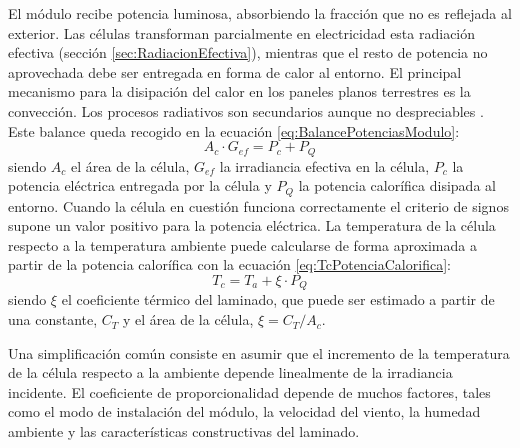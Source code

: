 El módulo recibe potencia luminosa, absorbiendo la fracción que no
es reflejada al exterior. Las células transforman parcialmente en
electricidad esta radiación efectiva (sección \ref{sec:RadiacionEfectiva}),
mientras que el resto de potencia no aprovechada debe ser entregada
en forma de calor al entorno. El principal mecanismo para la disipación
del calor en los paneles planos terrestres es la convección. Los procesos
radiativos son secundarios aunque no despreciables \citep{Luque.Hegedus2003}.
Este balance queda recogido en la ecuación \ref{eq:BalancePotenciasModulo}:
\begin{equation}
A_{c}\cdot G_{ef}=P_{c}+P_{Q}\label{eq:BalancePotenciasModulo}\end{equation}
siendo $A_{c}$ el área de la célula, $G_{ef}$ la irradiancia efectiva
en la célula, $P_{c}$ la potencia eléctrica entregada por la célula
y $P_{Q}$
la potencia calorífica disipada al entorno. Cuando la célula en cuestión
funciona correctamente el criterio de signos supone un valor positivo
para la potencia eléctrica. La temperatura de la célula respecto a
la temperatura ambiente puede calcularse de forma aproximada a partir
de la potencia calorífica con la ecuación \ref{eq:TcPotenciaCalorifica}:\begin{equation}
T_{c}=T_{a}+\xi\cdot P_{Q}\label{eq:TcPotenciaCalorifica}\end{equation}
siendo $\xi$ el coeficiente térmico del laminado, que puede ser
estimado a partir de una constante, $C_{T}$ y el área de la célula,
$\xi=C_{T}/A_{c}$. 

Una simplificación común consiste en asumir que el incremento de la
temperatura de la célula respecto a la ambiente depende linealmente
de la irradiancia incidente. El coeficiente de proporcionalidad depende
de muchos factores, tales como el modo de instalación del módulo,
la velocidad del viento, la humedad ambiente y las características
constructivas del laminado. 

